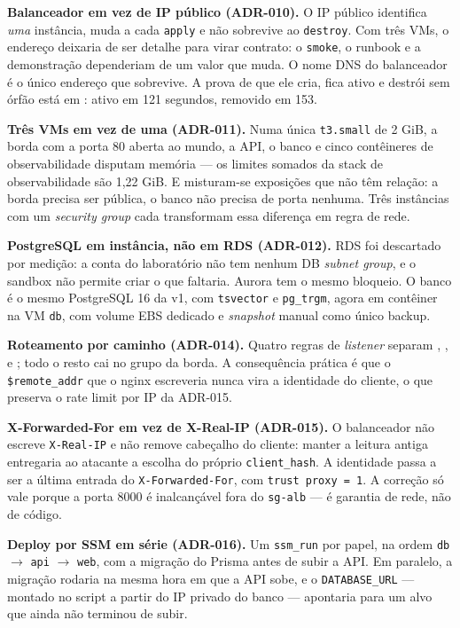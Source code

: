 \documentclass[11pt,a4paper]{article}
\begin{document}
\textbf{Balanceador em vez de IP público (ADR-010).} O IP público identifica \emph{uma} instância,
muda a cada \texttt{apply} e não sobrevive ao \texttt{destroy}. Com três VMs, o endereço deixaria de
ser detalhe para virar contrato: o \texttt{smoke}, o runbook e a demonstração dependeriam de um valor
que muda. O nome DNS do balanceador é o único endereço que sobrevive. A prova de que ele cria,
fica ativo e destrói sem órfão está em : ativo em 121
segundos, removido em 153.

\textbf{Três VMs em vez de uma (ADR-011).} Numa única \texttt{t3.small} de 2 GiB, a borda com a
porta 80 aberta ao mundo, a API, o banco e cinco contêineres de observabilidade disputam memória ---
os limites somados da stack de observabilidade são 1,22 GiB. E misturam-se exposições que não têm
relação: a borda precisa ser pública, o banco não precisa de porta nenhuma. Três instâncias com um
\emph{security group} cada transformam essa diferença em regra de rede.

\textbf{PostgreSQL em instância, não em RDS (ADR-012).} RDS foi descartado por medição: a conta do
laboratório não tem nenhum DB \emph{subnet group}, e o sandbox não permite criar o que faltaria.
Aurora tem o mesmo bloqueio. O banco é o mesmo PostgreSQL 16 da v1, com \texttt{tsvector} e
\texttt{pg\_trgm}, agora em contêiner na VM \texttt{db}, com volume EBS dedicado e \emph{snapshot}
manual como único backup.

\textbf{Roteamento por caminho (ADR-014).} Quatro regras de \emph{listener} separam
, ,  e ; todo o resto cai no
grupo da borda. A consequência prática é que o \texttt{\$remote\_addr} que o nginx escreveria nunca
vira a identidade do cliente, o que preserva o rate limit por IP da ADR-015.

\textbf{X-Forwarded-For em vez de X-Real-IP (ADR-015).} O balanceador não escreve
\texttt{X-Real-IP} e não remove cabeçalho do cliente: manter a leitura antiga entregaria ao atacante
a escolha do próprio \texttt{client\_hash}. A identidade passa a ser a última entrada do
\texttt{X-Forwarded-For}, com \texttt{trust proxy = 1}. A correção só vale porque a porta 8000 é
inalcançável fora do \texttt{sg-alb} --- é garantia de rede, não de código.

\textbf{Deploy por SSM em série (ADR-016).} Um \texttt{ssm\_run} por papel, na ordem
\texttt{db} $\rightarrow$ \texttt{api} $\rightarrow$ \texttt{web}, com a migração do Prisma antes de
subir a API. Em paralelo, a migração rodaria na mesma hora em que a API sobe, e o
\texttt{DATABASE\_URL} --- montado no script a partir do IP privado do banco --- apontaria para um
alvo que ainda não terminou de subir.
\end{document}
